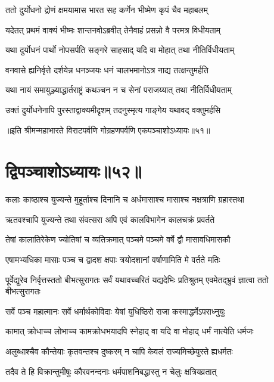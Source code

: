 
\twolineshloka
{ततो दुर्योधनो द्रोणं क्षमयामास भारत}
{सह कर्णेन भीष्मेण कृपं चैव महाबलम्}




\twolineshloka
{यदेतत् प्रथमं वाक्यं भीष्मः शान्तनवोऽब्रवीत्}
{तेनैवाहं प्रसन्नो वै परमत्र विधीयताम्}


\twolineshloka
{यथा दुर्योधनं पार्थो नोपसर्पति सङ्गरे}
{साहसाद् यदि वा मोहात् तथा नीतिर्विधीयताम्}


\twolineshloka
{वनवासे ह्यनिर्वृत्ते दर्शयेन्न धनञ्जयः}
{धनं चालभमानोऽत्र नाद्य तत्क्षन्तुमर्हति}


\twolineshloka
{यथा नायं समायुञ्ज्याद्धार्तराष्ट्रं कथञ्चन}
{न च सेनां पराजय्यात् तथा नीतिर्विधीयताम्}


\twolineshloka
{उक्तं दुर्योधनेनापि पुरस्ताद्वाक्यमीदृशम्}
{तदनुस्मृत्य गाङ्गेय यथावद् वक्तुमर्हसि}

॥इति श्रीमन्महाभारते विराटपर्वणि गोग्रहणपर्वणि एकपञ्चाशोऽध्यायः॥५१॥

\chapter{द्विपञ्चाशोऽध्यायः॥५२॥}

\twolineshloka
{कलाः काष्ठाश्च युज्यन्ते मुहूर्ताश्च दिनानि च}
{अर्धमासाश्च मासाश्च नक्षत्राणि ग्रहास्तथा}


\twolineshloka
{ऋतवश्चापि युज्यन्ते तथा संवत्सरा अपि}
{एवं कालविभागेन कालचक्रं प्रवर्तते}


\twolineshloka
{तेषां कालातिरेकेण ज्योतिषां च व्यतिक्रमात्}
{पञ्चमे पञ्चमे वर्षे द्वौ मासावधिमासकौ}


\twolineshloka
{एषामभ्यधिका मासाः पञ्च च द्वादश क्षपाः}
{त्रयोदशानां वर्षाणामिति मे वर्तते मतिः}


\onelineshloka
{पूर्वेद्युरेव निर्वृत्तस्ततो बीभत्सुरागतः}
\twolineshloka
{सर्वं यथावच्चरितं यद्यदेभिः प्रतिश्रुतम्}
{एवमेतद्भ्रुवं ज्ञात्वा ततो बीभत्सुरागतः}


\twolineshloka
{सर्वे पञ्च महात्मानः सर्वे धर्मार्थकोविदाः}
{येषां युधिष्ठिरो राजा कस्माद्धर्मेऽपराध्नुयुः}


\twolineshloka
{कामात् क्रोधाच्च लोभाच्च कामक्रोधभयादपि}
{स्नेहाद् वा यदि वा मोहाद् धर्मं नात्येति धर्मजः}


\twolineshloka
{अलुब्धाश्चैव कौन्तेयाः कृतवन्तश्च दुष्करम्}
{न चापि केवलं राज्यमिच्छेयुस्ते ह्यधर्मतः}


\twolineshloka
{तदैव ते हि विक्रान्तुमीषुः कौरवनन्दनाः}
{धर्मपाशनिबद्धास्तु न चेलुः क्षत्रियव्रतात्}


